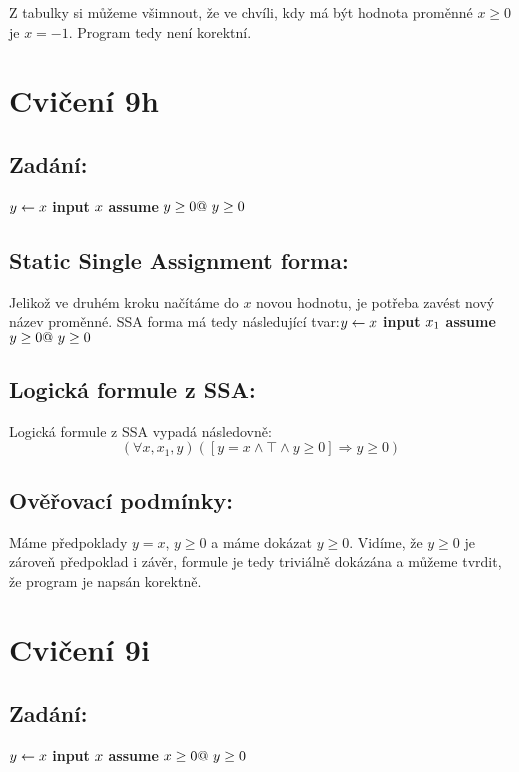 \documentclass{article}
\begin{document}
Z tabulky si můžeme všimnout, že ve chvíli, kdy má být hodnota proměnné $x \geq 0$ je $x = -1$. Program tedy není korektní.

\section{Cvičení 9h}

\subsection{Zadání:}
$y \leftarrow x \newline$ \textbf{input} $x \newline$ \textbf{assume} $ y \geq 0 \newline @ \ y \geq 0$

\subsection{Static Single Assignment forma:}
Jelikož ve druhém kroku načítáme do $x$ novou hodnotu, je potřeba zavést nový název proměnné. SSA forma má tedy následující tvar:\newline\newline $y \leftarrow x \newline $ \textbf{input} $ x_1  \newline$ \textbf{assume} $y \geq 0 \newline @ \ y \geq 0$

\subsection{Logická formule z SSA:}
Logická formule z SSA vypadá následovně:
$$ (\forall x, x_1, y)([y = x \wedge \top \wedge y \geq 0] \Rightarrow y \geq 0) $$

\subsection{Ověřovací podmínky:}
Máme předpoklady $y = x$, $y \geq 0$ a máme dokázat $y \geq 0$. Vidíme, že $y \geq 0$ je zároveň předpoklad i závěr, formule je tedy triviálně dokázána a můžeme tvrdit, že program je napsán korektně.

\section{Cvičení 9i}

\subsection{Zadání:}
$y \leftarrow x \newline$ \textbf{input} $x \newline$ \textbf{assume} $ x \geq 0 \newline @ \ y \geq 0$
\end{document}
